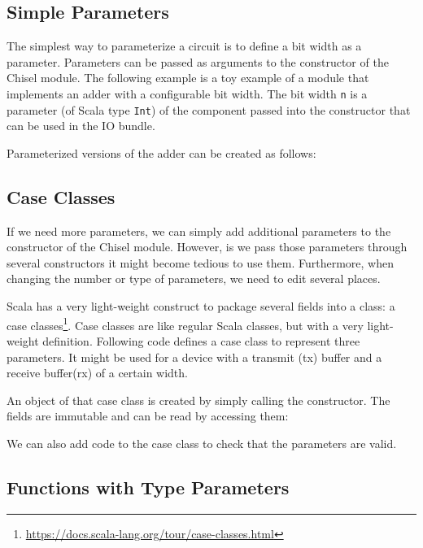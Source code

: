 \documentclass[%
    10pt,
    headinclude, footexclude,
    openright, %
    notitlepage,
    cleardoubleempty,
    headsepline,
    pointlessnumbers,
    bibtotoc, idxtotoc,
    ]{scrbook}
\newcommand{\code}[1]{{\small{\texttt{#1}}}}
\newcommand{\myref}[2]{\href{#1}{#2}}
\renewcommand{\myref}[2]{{#2}{\footnote{\url{#1}}}}
\begin{document}
\subsection{Simple Parameters}

The simplest way to parameterize a circuit is to define a bit width as a parameter.
Parameters can be passed as arguments to
the constructor of the Chisel module. The following example is a toy example of
a module that implements an adder with a configurable bit width.
The bit width \code{n} is a parameter (of Scala type \code{Int}) of the component
passed into the constructor that can be used in the IO bundle.


\noindent Parameterized versions of the adder can be created as follows:


\subsection{Case Classes}

If we need more parameters, we can simply add additional parameters to the constructor
of the Chisel module. However, is we pass those parameters through several constructors
it might become tedious to use them. Furthermore, when changing the number or type of
parameters, we need to edit several places.

Scala has a very light-weight construct to package several fields into a class:
a \myref{https://docs.scala-lang.org/tour/case-classes.html}{case classes}.
Case classes are like regular Scala classes, but with a very light-weight definition.
Following code defines a case class to represent three parameters. It might be used for
a device with a transmit (tx) buffer and a receive buffer(rx) of a certain width.


\noindent An object of that case class is created by simply calling the constructor.
The fields are immutable and can be read by accessing them:


\noindent We can also add code to the case class to check that the parameters
are valid.


\subsection{Functions with Type Parameters}
\end{document}
